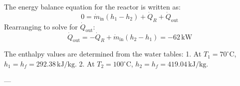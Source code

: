 The energy balance equation for the reactor is written as:  
\[
0 = \dot{m}_{\text{in}} (h_1 - h_2) + \dot{Q}_R + \dot{Q}_{\text{out}}
\]  
Rearranging to solve for \( \dot{Q}_{\text{out}} \):  
\[
\dot{Q}_{\text{out}} = -\dot{Q}_R + \dot{m}_{\text{in}} (h_2 - h_1) = -62 \, \text{kW}
\]  

The enthalpy values are determined from the water tables:  
1. At \( T_1 = 70^\circ\text{C} \), \( h_1 = h_f = 292.38 \, \text{kJ/kg} \).  
2. At \( T_2 = 100^\circ\text{C} \), \( h_2 = h_f = 419.04 \, \text{kJ/kg} \).  

---